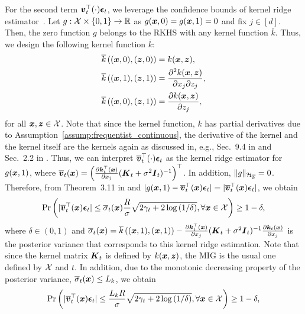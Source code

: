 For the second term $\boldsymbol{v}_t^\top (\cdot) \boldsymbol{\epsilon}_t$, we leverage the confidence bounds of kernel ridge estimator~\citep[Theorem~3.11 in][]{abbasi2013online}.
%
Let $g: {\cal X} \times \{0, 1\} \rightarrow \mathbb{R}$ as $g(\boldsymbol{x}, 0) = g(\boldsymbol{x}, 1) = 0$ and fix $j \in [d]$.
%
Then, the zero function $g$ belongs to the RKHS with any kernel function $\overline{k}$.
%
Thus, we design the following kernel function $\overline{k}$:
\begin{align*}
    \overline{k}\left( (\boldsymbol{x}, 0), (\boldsymbol{z}, 0)  \right) &= k(\boldsymbol{x}, \boldsymbol{z}), \\
    \overline{k}\left( (\boldsymbol{x}, 1), (\boldsymbol{z}, 1)  \right) &= \frac{\partial^2 k(\boldsymbol{x}, \boldsymbol{z})}{\partial x_j \partial z_j}, \\
    \overline{k}\left( (\boldsymbol{x}, 0), (\boldsymbol{z}, 1)  \right) &= \frac{\partial k(\boldsymbol{x}, \boldsymbol{z})}{ \partial z_j}, 
\end{align*}
for all $\boldsymbol{x}, \boldsymbol{z} \in {\cal X}$.
%
Note that since the kernel function, $k$ has partial derivatives due to Assumption~\ref{assump:frequentist_continuous}, the derivative of the kernel and the kernel itself are the kernels again as discussed in, e.g., Sec.~9.4 in \citet{Rasmussen2005-Gaussian} and Sec.~2.2 in \citet{adler1981geometry}.
%
Thus, we can interpret $\overline{\boldsymbol{v}}_t^\top (\cdot) \boldsymbol{\epsilon}_t$ as the kernel ridge estimator for $g(\boldsymbol{x}, 1)$, where $\overline{\boldsymbol{v}}_t (\boldsymbol{x}) = \left( \frac{\partial \boldsymbol{k}_t^\top(\boldsymbol{x})}{\partial x_j} (\boldsymbol{K}_t + \sigma^2 \boldsymbol{I}_t)^{-1}\right)^\top$.
%
In addition, $\| g \|_{{\cal H}_{\overline{k}}} = 0$.
%
Therefore, from Theorem~3.11 in \citet{abbasi2013online} and $|g(\boldsymbol{x}, 1) - \overline{\boldsymbol{v}}_t^\top (\boldsymbol{x}) \boldsymbol{\epsilon}_t| = |\overline{\boldsymbol{v}}_t^\top (\boldsymbol{x}) \boldsymbol{\epsilon}_t|$, we obtain
\begin{align*}
    \Pr \left( |\overline{\boldsymbol{v}}_t^\top (\boldsymbol{x}) \boldsymbol{\epsilon}_t| \leq \overline{\sigma}_t(\boldsymbol{x}) \frac{R}{\sigma} \sqrt{ 2 \gamma_t + 2 \log \left( 1 / \delta \right)}, \forall \boldsymbol{x} \in {\cal X} \right) \geq 1 - \delta,
\end{align*}
where $\delta \in (0, 1)$ and $\overline{\sigma}_t(\boldsymbol{x}) = \overline{k}\left( (\boldsymbol{x}, 1), (\boldsymbol{x}, 1) \right) - \frac{\partial \boldsymbol{k}_t^\top(\boldsymbol{x})}{\partial x_j} (\boldsymbol{K}_t + \sigma^2 \boldsymbol{I}_t)^{-1} \frac{\partial \boldsymbol{k}_t(\boldsymbol{x})}{\partial x_j}$ is the posterior variance that corresponds to this kernel ridge estimation.
%
Note that since the kernel matrix $\boldsymbol{K}_t$ is defined by $ k(\boldsymbol{x}, \boldsymbol{z})$, the MIG is the usual one defined by ${\cal X}$ and $t$.
%
In addition, due to the monotonic decreasing property of the posterior variance, $\overline{\sigma}_t(\boldsymbol{x}) \leq L_k$, we obtain
\begin{align*}
    \Pr \left( |\overline{\boldsymbol{v}}_t^\top (\boldsymbol{x}) \boldsymbol{\epsilon}_t| \leq \frac{L_k R}{\sigma} \sqrt{ 2 \gamma_t + 2 \log \left( 1 / \delta \right)}, \forall \boldsymbol{x} \in {\cal X} \right) \geq 1 - \delta,
\end{align*}
